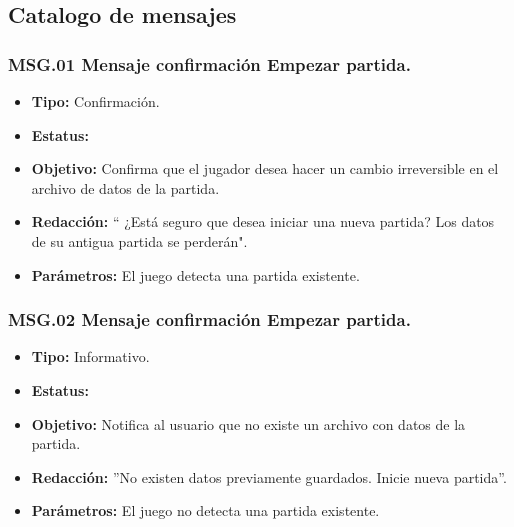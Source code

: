 \subsection{Catalogo de mensajes}

\subsubsection{MSG.01 Mensaje confirmación Empezar partida.} \label{MSG:01} 
\begin{itemize}
	\item \textbf{Tipo:} Confirmación.
	\item \textbf{Estatus:}
	\item \textbf{Objetivo:} Confirma que el jugador desea hacer un cambio irreversible en el archivo de datos de la partida.
	\item \textbf{Redacción:} “ ¿Está seguro que desea iniciar una nueva partida? Los datos de su antigua partida se perderán".
	\item \textbf{Parámetros:}  El juego detecta una partida existente.
\end{itemize}

\subsubsection{MSG.02 Mensaje confirmación Empezar partida.} \label{MSG:02} 
\begin{itemize}
	\item \textbf{Tipo:} Informativo.
	\item \textbf{Estatus:}
	\item \textbf{Objetivo:} Notifica al usuario que no existe un archivo con datos de la partida.
	\item \textbf{Redacción:} ”No existen datos previamente guardados. Inicie nueva partida”.
	\item \textbf{Parámetros:}   El juego no detecta una partida existente.
\end{itemize}

